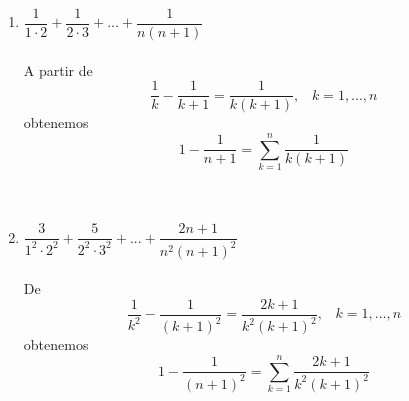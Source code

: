 \begin{enumerate}[\bfseries 1.]
\begin{enumerate}[\bfseries (i)]
	 \item $\dfrac{1}{1 \cdot 2} + \dfrac{1}{2 \cdot 3} + ... + \dfrac{1}{n(n+1)}$\\\\ 
	 A partir de $$\dfrac{1}{k} - \dfrac{1}{k+1} = \dfrac{1}{k(k+1)}, \; \; \; k=1,...,n$$ obtenemos $$1-\dfrac{1}{n+1} = \displaystyle\sum_{k=1}^n \dfrac{1}{k(k+1)}$$ \\\\

	 \item $\dfrac{3}{1^2 \cdot 2^2} + \dfrac{5}{2^2 \cdot 3^2} + ... + \dfrac{2n +1}{n^2 (n+1)^2}$\\\\
	 De $$\dfrac{1}{k^2} - \dfrac{1}{(k+1)^2} = \dfrac{2k+1}{k^2(k+1)^2}, \; \; \; k=1,...,n$$ obtenemos $$1-\dfrac{1}{(n+1)^2} = \displaystyle\sum_{k=1}^n \dfrac{2k+1}{k^2(k+1)^2}$$  \\\\
	 \end{enumerate}


\end{enumerate}

